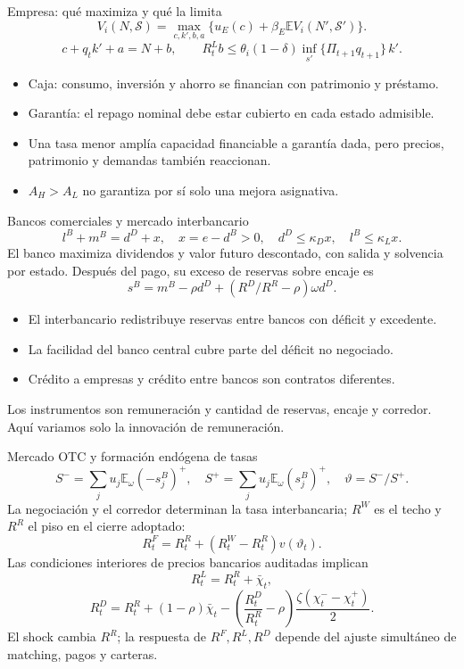 \documentclass[aspectratio=169,11pt]{beamer}
\begin{document}
\begin{frame}{Empresa: qué maximiza y qué la limita}
\[
V_i(N,\mathcal S)=\max_{c,k',b,a}\{u_E(c)+\beta_E\mathbb E V_i(N',\mathcal S')\}.
\]
\[
c+q_t k'+a=N+b,\qquad
R^L_t b\leq\theta_i(1-\delta)\inf_{s'}\{\Pi_{t+1}q_{t+1}\}\,k'.
\]
\begin{itemize}
\item Caja: consumo, inversión y ahorro se financian con patrimonio y préstamo.
\item Garantía: el repago nominal debe estar cubierto en cada estado admisible.
\item Una tasa menor amplía capacidad financiable a garantía dada, pero precios,
patrimonio y demandas también reaccionan.
\item $A_H>A_L$ no garantiza por sí solo una mejora asignativa.
\end{itemize}
\end{frame}

\begin{frame}{Bancos comerciales y mercado interbancario}
\[
l^B+m^B=d^D+x,\quad x=e-d^B>0,\quad
 d^D\leq\kappa_Dx,\quad l^B\leq\kappa_Lx.
\]
El banco maximiza dividendos y valor futuro descontado, con salida y solvencia
por estado. Después del pago, su exceso de reservas sobre encaje es
\[
s^B=m^B-\rho d^D+(R^D/R^R-\rho)\omega d^D.
\]
\begin{itemize}
\item El interbancario redistribuye reservas entre bancos con déficit y excedente.
\item La facilidad del banco central cubre parte del déficit no negociado.
\item Crédito a empresas y crédito entre bancos son contratos diferentes.
\end{itemize}
Los instrumentos son remuneración y cantidad de reservas, encaje y corredor.
Aquí variamos solo la innovación de remuneración.
\end{frame}

\begin{frame}{Mercado OTC y formación endógena de tasas}
\small
\[
S^-=\sum_j u_j\mathbb E_\omega(-s_j^B)^+,\quad
S^+=\sum_j u_j\mathbb E_\omega(s_j^B)^+,\quad
\vartheta=S^-/S^+.
\]
La negociación y el corredor determinan la tasa interbancaria; $R^W$ es el techo y $R^R$ el piso en el cierre adoptado:
\[
R^F_t=R^R_t+(R^W_t-R^R_t)v(\vartheta_t).
\]
Las condiciones interiores de precios bancarios auditadas implican
\[
R^L_t=R^R_t+\bar\chi_t,
\]
\[
R^D_t=R^R_t+(1-\rho)\bar\chi_t-
\left(\frac{R^D_t}{R^R_t}-\rho\right)
\frac{\zeta(\chi^-_t-\chi^+_t)}{2}.
\]
\footnotesize
El shock cambia $R^R$; la respuesta de $R^F,R^L,R^D$
depende del ajuste simultáneo de matching, pagos y carteras.
\end{frame}
\end{document}
